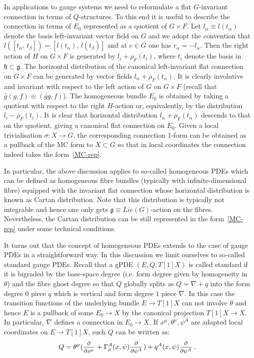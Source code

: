 \documentclass[a4paper,12pt]{article}
\numberwithin{equation}{section} %
\renewcommand{\d}{\partial}
\newcommand{\commut}[2]{[#1{,}\,#2]}
\newcommand{\ffrac}[2]{\raisebox{.5pt}%
  {\footnotesize$\displaystyle\frac{#1}{#2}$}\kern1pt}
\newcommand{\dl}[1]{\mathchoice{\ffrac{\d}{\d #1}}{\frac{\d}{\d #1}}{\ffrac{\d}{\d #1}}{\ffrac{\d}{\d #1}}}
\newcommand{\Liealg}{\mathfrak}
\newcommand{\algg}{\Liealg{g}}
\newcommand{\algh}{\Liealg{h}}
\begin{document}
In applications to gauge systems we need to reformulate a flat $G$-invariant connection in terms of $Q$-structures. To this end it is useful to describe the connection in terms of $E_0$ represented as a quotient of $G\times F$.
Let $l_\alpha\equiv l(t_\alpha)$ denote the basis left-invariant vector field on $G$ and we adopt the convention that $l(\commut{t_\alpha}{t_\beta})=\commut{l(t_\alpha)}{l(t_\beta)}$ and at $e\in G$ one has $r_\alpha=-l_\alpha$. Then the right action of $H$ on $G\times F$ is generated by $l_i+\rho_F(t_i)$, where $t_i$ denote the basis in $\algh\subset \algg$. The horizontal distribution of the canonical left-invariant flat connection on $G\times F$ can be generated by vector fields $l_\alpha+\rho_F(t_\alpha)$. It is clearly involutive and invariant with respect to the left action of $G$ on $G \times F$ (recall that $\bar g(g,f)\equiv (\bar gg,f)$). The homogeneous bundle $E_0$ is obtained by taking a quotient with respect to the right $H$-action or, equivalently,  by the distribution $l_i-\rho_F(t_i)$. It is clear that horizontal distribution $l_\alpha+\rho_F(t_\alpha)$ descends to that on the quotient, giving a canonical flat connection on $E_0$. Given a local trivialisation $\sigma:X\to G$, the corresponding connection 1-form can be obtained as a pullback of the MC form to $X\subset G$ so that in local coordinates the connection indeed takes the form~\eqref{MC-rep}.




In particular, the above discussion applies to so-called homogeneous PDEs which can be defined as homogeneous fibre bundles (typically with infinite-dimensional fibre) equipped with the invariant flat connection whose horizontal distribution is known as Cartan distribution. Note that this distribution is typically not integrable and hence one only gets $\algg\equiv Lie(G)$-action on the fibres. Nevertheless, the Cartan distribution can be still represented in the form~\eqref{MC-rep} under some technical conditions.

It turns out that the concept of homogeneous PDEs extends to the case of gauge PDEs in a straightforward way. In this discussion we limit ourselves to so-called standard gauge PDEs. Recall that a gPDE $(E,Q,T[1]X)$ is called standard if it is bigraded by the base-space degree (i.e. form degree given by homogeneity in $\theta$) and the fibre ghost degree so that $Q$ globally splits as $Q=\nabla +q$ into the form degree $0$ piece $q$ which is vertical and form 
degree $1$ piece $\nabla$.  In this case the transition functions of the underlying bundle $E\to T[1]X$ can not involve $\theta$  and hence 
$E$ is a pullback of some $E_0\to X$ by the canonical projection $T[1]X \to X$. In particular, $\nabla$ defines a connection in $E_0 \to X$. If $x^\mu,\theta^\mu,\psi^A$ are adapted local coordinates on $E \to T[1]X$, such $Q$ can be written as:
\begin{equation}
\label{standard-Q-exp}
Q=\theta^\mu(\dl{x^\mu}+\Gamma_\mu^A(x,\psi)\dl{\psi^A})+q^A(x,\psi)\dl{\psi^A}\,.
\end{equation}
\end{document}

